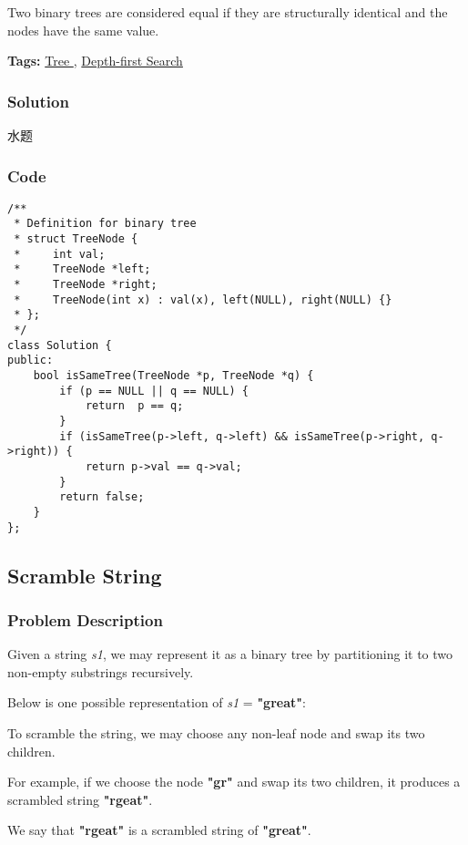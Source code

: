 \documentclass{article}
\begin{document}
\begin{CJK*}{UTF8}{gkai}
Two binary trees are considered equal if they are structurally identical and the nodes have the same value.


\textbf{Tags: }
\hyperref[ Tree ]{ Tree },  \hyperref[ Depth-first Search ]{ Depth-first Search }



\subsubsection*{Solution}
水题

\subsubsection*{Code}
\begin{lstlisting}
/**
 * Definition for binary tree
 * struct TreeNode {
 *     int val;
 *     TreeNode *left;
 *     TreeNode *right;
 *     TreeNode(int x) : val(x), left(NULL), right(NULL) {}
 * };
 */
class Solution {
public:
    bool isSameTree(TreeNode *p, TreeNode *q) {
        if (p == NULL || q == NULL) {
            return  p == q;
        }
        if (isSameTree(p->left, q->left) && isSameTree(p->right, q->right)) {
            return p->val == q->val;
        }
        return false;
    }
}; 
\end{lstlisting}


\subsection{ Scramble String }
\label{ Scramble String }

\subsubsection*{Problem Description}
Given a string \emph{s1}, we may represent it as a binary tree by partitioning it to two non-empty substrings recursively.

Below is one possible representation of \emph{s1} = \textbf{"great"}:

To scramble the string, we may choose any non-leaf node and swap its two children.

For example, if we choose the node \textbf{"gr"} and swap its two children, it produces a scrambled string \textbf{"rgeat"}.

We say that \textbf{"rgeat"} is a scrambled string of \textbf{"great"}.


\end{CJK*}
\end{document}
